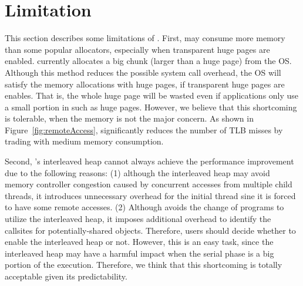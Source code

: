 \section{Limitation}
\label{sec:limit}

This section describes some limitations of \NM{}. First, \NM{} may consume more memory than some popular allocators, especially when transparent huge pages are enabled. \NM{} currently allocates a big chunk (larger than a huge page) from the OS. Although this method reduces the possible system call overhead, the OS will satisfy the memory allocations with huge pages, if transparent huge pages are enables. That is, the whole huge page will be wasted even if applications only use a small portion in such as huge pages. However, we believe that this shortcoming is tolerable, when the memory is not the major concern. As shown in Figure~\ref{fig:remoteAccess}, \NM{} significantly reduces the number of TLB misses by trading with medium memory consumption. 


Second, \NM{}'s interleaved heap cannot always achieve the performance improvement due to the following reasons: (1) although the interleaved heap may avoid memory controller congestion caused by concurrent accesses from multiple child threads, it introduces unnecessary overhead for the initial thread sine it is forced to have some remote accesses. (2) Although \NM{} avoids the change of programs to utilize the interleaved heap, it imposes additional overhead to identify the callsites for potentially-shared objects. Therefore, users should decide whether to enable the interleaved heap or not. However, this is an easy task, since the interleaved heap may have a harmful impact when the serial phase is a big portion of the execution. Therefore, we think that this shortcoming is totally acceptable given  its predictability. 

